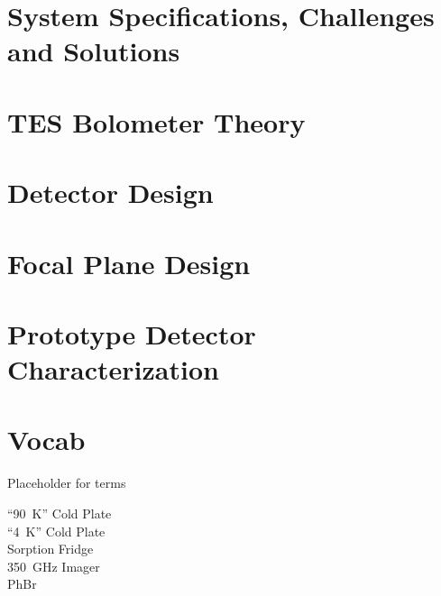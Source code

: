 \documentclass[10pt,twocolumn,article]{memoir}
\newcommand*{\here}{here}
\begin{document}
\chapter{System Specifications, Challenges and Solutions}\label{c:specs}

\chapter{TES Bolometer Theory}\label{c:tes}

\renewcommand{\here}{ch4-sys-design}


\chapter{Detector Design}\label{c:det-design}

\chapter{Focal Plane Design}\label{c:fp-design}

\chapter{Prototype Detector Characterization}\label{c:proto-det}

\renewcommand{\here}{ch8-subarray}


\renewcommand{\here}{ch9-imaging}


\chapter{Vocab}

Placeholder for terms

\begin{description}
\item[``90~K'' Cold Plate]
\item[``4~K'' Cold Plate]
\item[Sorption Fridge]
\item[350~GHz Imager]
\item[PhBr]

\end{description}

\printbibliography
\end{document}
